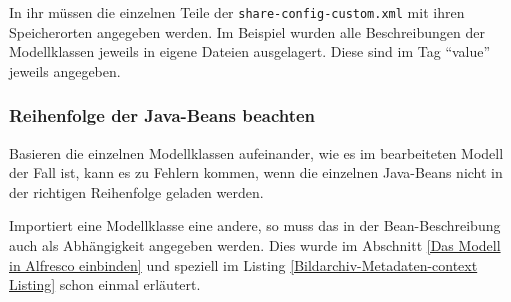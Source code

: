 In ihr m\"ussen die einzelnen Teile der \texttt{share-config-custom.xml} mit ihren Speicherorten angegeben werden. Im Beispiel wurden alle Beschreibungen der Modellklassen jeweils in eigene Dateien ausgelagert. Diese sind im Tag "`value"' jeweils angegeben.



\subsubsection{Reihenfolge der Java-Beans beachten}
Basieren die einzelnen Modellklassen aufeinander, wie es im bearbeiteten Modell der Fall ist, kann es zu Fehlern kommen, wenn die einzelnen Java-Beans nicht in der richtigen Reihenfolge geladen werden. 

Importiert eine Modellklasse eine andere, so muss das in der Bean-Beschreibung auch als Abh\"angigkeit angegeben werden. Dies wurde im Abschnitt \ref{Das Modell in Alfresco einbinden} und speziell im Listing \ref{Bildarchiv-Metadaten-context Listing} schon einmal erl\"autert.
